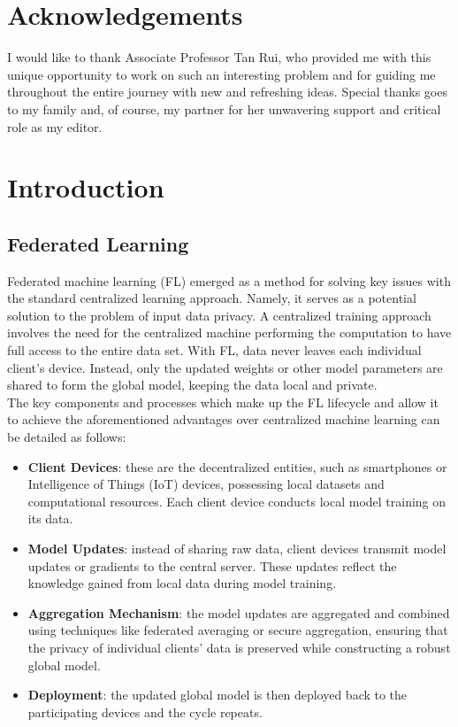 \documentclass[12pt]{article}
\begin{document}
\section{Acknowledgements}
I would like to thank Associate Professor Tan Rui, who provided me with this unique opportunity to work
on such an interesting problem and for guiding me throughout the entire journey with new and
refreshing ideas. Special thanks goes to my family and, of course, my
partner for her unwavering support and critical role as my editor.

\pagebreak
\tableofcontents
\listoffigures
\pagebreak

\section{Introduction}
\subsection{Federated Learning}
Federated machine learning (FL) emerged as a method for solving key issues with the standard centralized learning
approach. Namely, it serves as a potential solution to the problem of input data privacy. A centralized training approach involves the need for the centralized
machine performing the computation to have full access to the entire data set. With FL, data never
leaves each individual client's device. Instead, only the updated weights or other model parameters are shared to form the
global model, keeping the data local and private.\\

The key components and processes which make up the FL lifecycle and allow it to achieve the
aforementioned advantages over centralized machine learning can be detailed as follows:
\begin{itemize}
  \item \textbf{Client Devices}: these are the decentralized entities, such as smartphones or
    Intelligence of Things (IoT) devices, possessing local datasets and computational resources. Each client device conducts local model training on its data.
  \item \textbf{Model Updates}: instead of sharing raw data, client devices transmit model updates or gradients to the central server. These updates reflect the knowledge gained from local data during model training.
  \item \textbf{Aggregation Mechanism}: the model updates are aggregated and combined using techniques like federated averaging or secure aggregation, ensuring that the privacy of individual clients' data is preserved while constructing a robust global model.
  \item \textbf{Deployment}: the updated global model is then deployed back to the participating devices and
    the cycle repeats.
\end{itemize}
\end{document}

